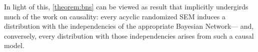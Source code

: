 {    %
    In light of this,
    \cref{theorem:bns} can be viewed as result 
        that implicitly undergirds much of the work on causality:
    every acyclic randomized SEM
    induces a distribution with the independencies of the appropriate Bayesian Network---%
    and, conversely,
    every distribution with those independencies
    arises from such a causal model.

}


